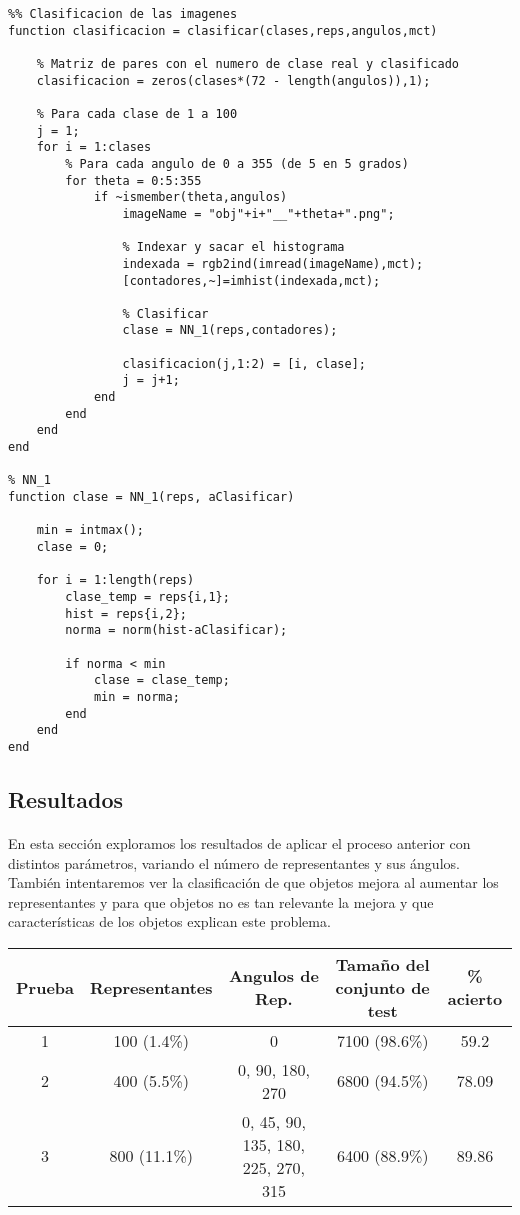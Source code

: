 \documentclass[es,gi]{ifirak}\usepackage[]{graphicx}\usepackage[]{color}
\begin{document}
\begin{lstlisting}
%% Clasificacion de las imagenes
function clasificacion = clasificar(clases,reps,angulos,mct)

    % Matriz de pares con el numero de clase real y clasificado
    clasificacion = zeros(clases*(72 - length(angulos)),1);
    
    % Para cada clase de 1 a 100
    j = 1;
    for i = 1:clases
        % Para cada angulo de 0 a 355 (de 5 en 5 grados)
        for theta = 0:5:355
            if ~ismember(theta,angulos)
                imageName = "obj"+i+"__"+theta+".png";

                % Indexar y sacar el histograma
                indexada = rgb2ind(imread(imageName),mct);
                [contadores,~]=imhist(indexada,mct);

                % Clasificar
                clase = NN_1(reps,contadores);

                clasificacion(j,1:2) = [i, clase];
                j = j+1;
            end
        end 
    end
end

% NN_1 
function clase = NN_1(reps, aClasificar)
    
    min = intmax();
    clase = 0;
    
    for i = 1:length(reps)
        clase_temp = reps{i,1};
        hist = reps{i,2};
        norma = norm(hist-aClasificar);
        
        if norma < min 
            clase = clase_temp;
            min = norma;
        end 
    end
end

\end{lstlisting}

\subsection{Resultados}
\paragraph{} En esta sección exploramos los resultados de aplicar el proceso anterior con distintos parámetros, variando el número de representantes y sus ángulos.\\

También intentaremos ver la clasificación de que objetos mejora al aumentar los representantes y para que objetos no es tan relevante la mejora y que características de los objetos explican este problema.\\

\begin{tabular}{ccccc}
 \toprule
	\bfseries Prueba &
    \bfseries Representantes &
	\bfseries Angulos de Rep.&
	\bfseries Tamaño del conjunto de test &
	\bfseries \% acierto \\
 \midrule
	1 & 100 (1.4\%) & 0 & 7100 (98.6\%) & 59.2 \\
	2 & 400 (5.5\%)& 0, 90, 180, 270 & 6800 (94.5\%) & 78.09\\
	3 & 800 (11.1\%)& 0, 45, 90, 135, 180, 225, 270, 315 & 6400 (88.9\%) & 89.86\\
 \bottomrule
\end{tabular}
\end{document}
